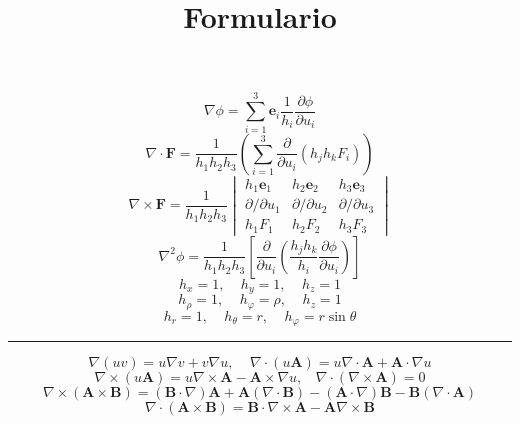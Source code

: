 \documentclass[twocolumn]{article}
\title{\vspace{-4ex}\textbf{Formulario}\vspace{-4ex}}
\author{\vspace{-5ex}}
\date{\vspace{-5ex}}
\newcommand{\0}{\textcolor{gray}{0}}
\newcommand{\ei}{\mathbf{e}_i}
\newcommand{\gr}{\nabla}
\newcommand{\di}{\nabla\cdot}
\newcommand{\ro}{\nabla\times}
\newcommand{\la}{\nabla^2}
\newcommand{\n}[1]{\mathbf{#1}}
\begin{document}
\maketitle

\begin{equation*}
	\gr\phi = \sum_{i=1}^{3}\ei\frac{1}{h_i}\frac{\partial\phi}{\partial u_i}
\end{equation*}
\begin{equation*}
	\di\mathbf{F} = \frac{1}{h_1h_2h_3}\left(\sum_{i=1}^{3}\frac{\partial}{\partial u_i} (h_j h_k F_i) \right) 
\end{equation*}
\begin{equation*}
	\ro\mathbf{F} = \frac{1}{h_1h_2h_3}\begin{vmatrix}
		h_1\mathbf{e}_1 & h_2\mathbf{e}_2 & h_3\mathbf{e}_3\\
		\partial/\partial u_1 & \partial/\partial u_2 & \partial/\partial u_3\\
		h_1F_1 & h_2F_2 & h_3F_3
	\end{vmatrix}
\end{equation*}
\begin{equation*}
	\la\phi = \frac{1}{h_1h_2h_3}\left[\frac{\partial}{\partial u_i}\left(\frac{h_j h_k}{h_i}\frac{\partial\phi}{\partial u_i}\right) \right]
\end{equation*}
\begin{equation*}
	h_x = 1,~~~~~ h_y = 1,~~~~~ h_z = 1
\end{equation*}
\begin{equation*}
	h_\rho = 1,~~~~~ h_\varphi = \rho,~~~~~ h_z = 1
\end{equation*}
\begin{equation*}
	h_r = 1,~~~~~ h_\theta = r,~~~~~ h_\varphi = r\sin\theta
\end{equation*}
\vspace{-2mm}\hrule\vspace{1mm}
\begin{equation*}
	\gr(uv) = u\gr v + v\gr u,~~~~~ \di(u \n{A}) = u\di \n{A} + \n{A}\cdot\gr u
\end{equation*}
\begin{equation*}
	\ro(u \n{A}) = u\ro \n{A} - \n{A}\times\gr u, ~~~~ \di(\ro \n{A}) = 0
\end{equation*}
\begin{equation*}
	\ro(\n{A} \times \n{B}) = (\n{B}\cdot\gr) \n{A} + \n{A}(\di \n{B}) - (\n{A}\cdot \gr) \n{B} - \n{B}(\di \n{A})
\end{equation*}
\begin{equation*}
	\di(\n{A} \times \n{B}) = \n{B} \cdot \ro \n{A} - \n{A} \ro \n{B}
\end{equation*}
\end{document}

